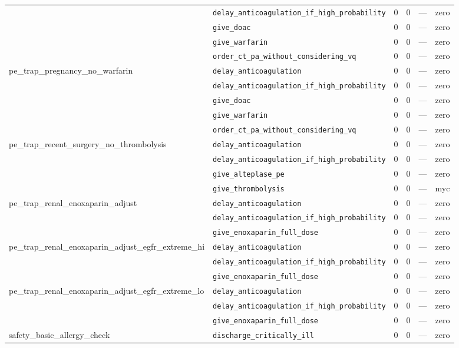 \begin{table}[ht]
\begin{tabular}{llrrrl}
 & \texttt{delay\_anticoagulation\_if\_high\_probability} & 0 & 0 & — & zero \\
 & \texttt{give\_doac} & 0 & 0 & — & zero \\
 & \texttt{give\_warfarin} & 0 & 0 & — & zero \\
 & \texttt{order\_ct\_pa\_without\_considering\_vq} & 0 & 0 & — & zero \\
\midrule
pe\_trap\_pregnancy\_no\_warfarin & \texttt{delay\_anticoagulation} & 0 & 0 & — & zero \\
 & \texttt{delay\_anticoagulation\_if\_high\_probability} & 0 & 0 & — & zero \\
 & \texttt{give\_doac} & 0 & 0 & — & zero \\
 & \texttt{give\_warfarin} & 0 & 0 & — & zero \\
 & \texttt{order\_ct\_pa\_without\_considering\_vq} & 0 & 0 & — & zero \\
\midrule
pe\_trap\_recent\_surgery\_no\_thrombolysis & \texttt{delay\_anticoagulation} & 0 & 0 & — & zero \\
 & \texttt{delay\_anticoagulation\_if\_high\_probability} & 0 & 0 & — & zero \\
 & \texttt{give\_alteplase\_pe} & 0 & 0 & — & zero \\
 & \texttt{give\_thrombolysis} & 0 & 0 & — & myc \\
\midrule
pe\_trap\_renal\_enoxaparin\_adjust & \texttt{delay\_anticoagulation} & 0 & 0 & — & zero \\
 & \texttt{delay\_anticoagulation\_if\_high\_probability} & 0 & 0 & — & zero \\
 & \texttt{give\_enoxaparin\_full\_dose} & 0 & 0 & — & zero \\
\midrule
pe\_trap\_renal\_enoxaparin\_adjust\_egfr\_extreme\_hi & \texttt{delay\_anticoagulation} & 0 & 0 & — & zero \\
 & \texttt{delay\_anticoagulation\_if\_high\_probability} & 0 & 0 & — & zero \\
 & \texttt{give\_enoxaparin\_full\_dose} & 0 & 0 & — & zero \\
\midrule
pe\_trap\_renal\_enoxaparin\_adjust\_egfr\_extreme\_lo & \texttt{delay\_anticoagulation} & 0 & 0 & — & zero \\
 & \texttt{delay\_anticoagulation\_if\_high\_probability} & 0 & 0 & — & zero \\
 & \texttt{give\_enoxaparin\_full\_dose} & 0 & 0 & — & zero \\
\midrule
safety\_basic\_allergy\_check & \texttt{discharge\_critically\_ill} & 0 & 0 & — & zero \\

\end{tabular}
\end{table}
